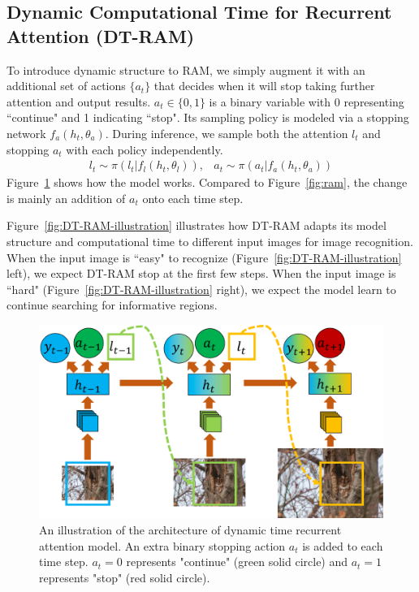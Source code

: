 \documentclass[10pt,twocolumn,letterpaper]{article}
\begin{document}
\subsection{Dynamic Computational Time for Recurrent Attention (DT-RAM)}

To introduce dynamic structure to RAM, we simply augment it with an additional set of actions $\{a_t\}$ that decides when it will stop taking further attention and output results.
$a_t \in \{0, 1\}$ is a binary variable with 0 representing ``continue" and 1 indicating ``stop".
Its sampling policy is modeled via a stopping network $f_a(h_t, \theta_a)$.
During inference, we sample both the attention $l_t$ and stopping $a_t$ with each policy independently.
\begin{eqnarray}
l_t \sim \pi(l_t | f_l(h_t, \theta_l)), & a_t \sim \pi(a_t | f_a(h_t, \theta_a))
\end{eqnarray}
Figure~\ref{fig:DT-RAM} shows how the model works.
Compared to Figure~\ref{fig:ram}, the change is mainly an addition of $a_t$ onto each time step.

Figure~\ref{fig:DT-RAM-illustration} illustrates how DT-RAM adapts its model structure and computational time to different input images for image recognition.
When the input image is ``easy" to recognize (Figure~\ref{fig:DT-RAM-illustration} left), we expect DT-RAM stop at the first few steps.
When the input image is ``hard" (Figure~\ref{fig:DT-RAM-illustration} right), we expect the model learn to continue searching for informative regions.

\setlength{\tabcolsep}{1pt}
\begin{figure}
\begin{center}
    \includegraphics[width=0.95\linewidth]{figs/model/dynamic_ram.pdf}
\end{center}
\caption{An illustration of the architecture of dynamic time recurrent attention model. An extra binary stopping action $a_t$ is added to each time step. $a_t=0$ represents "continue" (green solid circle) and $a_t=1$ represents "stop" (red solid circle).}
\label{fig:DT-RAM}
\end{figure}
\end{document}
